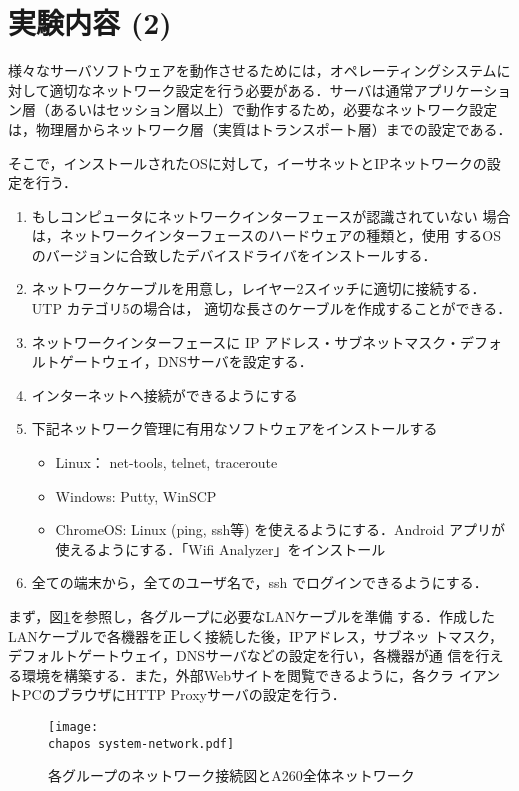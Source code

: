 \clearpage
\section{実験内容 (2)}

様々なサーバソフトウェアを動作させるためには，オペレーティングシステムに対して適切なネットワーク設定を行う必要がある．サーバは通常アプリケーション層（あるいはセッション層以上）で動作するため，必要なネットワーク設定は，物理層からネットワーク層（実質はトランスポート層）までの設定である．

そこで，インストールされたOSに対して，イーサネットとIPネットワークの設定を行う．
\begin{enumerate}
 \item もしコンピュータにネットワークインターフェースが認識されていない
       場合は，ネットワークインターフェースのハードウェアの種類と，使用
       するOSのバージョンに合致したデバイスドライバをインストールする．
 \item ネットワークケーブルを用意し，レイヤー2スイッチに適切に接続する．UTP カテゴリ5の場合は，
       適切な長さのケーブルを作成することができる．
 \item ネットワークインターフェースに IP アドレス・サブネットマスク・デフォ
       ルトゲートウェイ，DNSサーバを設定する．
 \item インターネットへ接続ができるようにする
 \item 下記ネットワーク管理に有用なソフトウェアをインストールする
 \begin{itemize}
     \item Linux： net-tools, telnet, traceroute
     \item Windows: Putty, WinSCP
     \item ChromeOS: Linux (ping, ssh等) を使えるようにする．Android アプリが使えるようにする．「Wifi Analyzer」をインストール
 \end{itemize}
 \item 全ての端末から，全てのユーザ名で，ssh でログインできるようにする．
\end{enumerate}

まず，図\ref{fig:01:system}を参照し，各グループに必要なLANケーブルを準備
する．作成したLANケーブルで各機器を正しく接続した後，IPアドレス，サブネッ
トマスク，デフォルトゲートウェイ，DNSサーバなどの設定を行い，各機器が通
信を行える環境を構築する．また，外部Webサイトを閲覧できるように，各クラ
イアントPCのブラウザにHTTP Proxyサーバの設定を行う．

\begin{figure}[tb]
    \centering
        \texttt{[image: \\chapos system-network.pdf]}
        \caption{各グループのネットワーク接続図とA260全体ネットワーク}
        \label{fig:01:system}
\end{figure}

